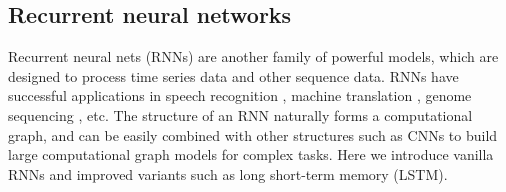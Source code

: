 \subsection{Recurrent neural networks}\label{sec:RNN}
Recurrent neural nets (RNNs) are another family of powerful models, which are designed to process time series data and other sequence data. RNNs have successful applications in speech recognition \citep{sak2014long}, machine translation \citep{wu2016google}, genome sequencing \citep{cao2018deep}, etc. The structure of an RNN naturally forms a computational graph, and can be easily combined with other structures such as CNNs to build large computational graph models for complex tasks. Here we introduce vanilla RNNs and improved variants such as long short-term memory (LSTM).


